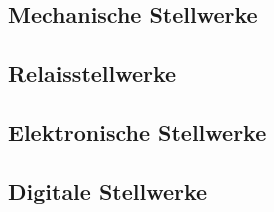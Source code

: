 \subsection{Mechanische Stellwerke}\label{text:Grundlagen:Stellwerkstechnik:Mechanische-Stellwerke}

\subsection{Relaisstellwerke}\label{text:Grundlagen:Stellwerkstechnik:Relaisstellwerke}

\subsection{Elektronische Stellwerke}\label{text:Grundlagen:Stellwerkstechnik:Elektronische-Stellwerke}

\subsection{Digitale Stellwerke}\label{text:Grundlagen:Stellwerkstechnik:Digitale-Stellwerke}
